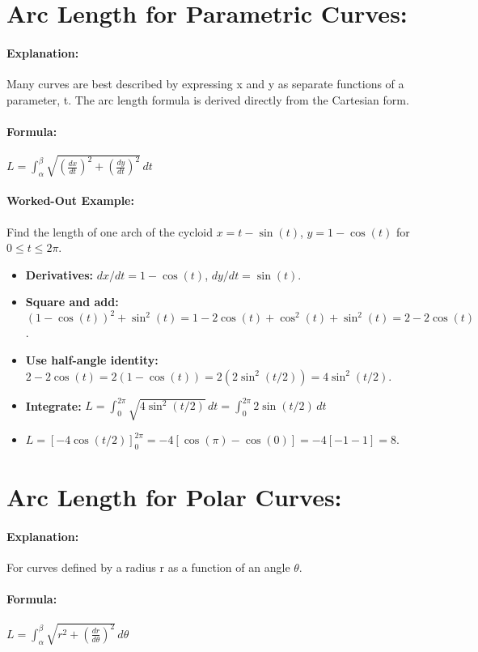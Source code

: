 \documentclass{article}
\begin{document}
\section*{Arc Length for Parametric Curves:}
\paragraph{Explanation:} Many curves are best described by expressing x and y as separate functions of a parameter, t. The arc length formula is derived directly from the Cartesian form.
\paragraph{Formula:} $L = \int_{\alpha}^{\beta} \sqrt{(\frac{dx}{dt})^2 + (\frac{dy}{dt})^2} \,dt$
\paragraph{Worked-Out Example:} Find the length of one arch of the cycloid $x = t - \sin(t)$, $y = 1 - \cos(t)$ for $0 \le t \le 2\pi$.
\begin{itemize}
    \item \textbf{Derivatives:} $dx/dt = 1 - \cos(t)$, $dy/dt = \sin(t)$.
    \item \textbf{Square and add:} $(1 - \cos(t))^2 + \sin^2(t) = 1 - 2\cos(t) + \cos^2(t) + \sin^2(t) = 2 - 2\cos(t)$.
    \item \textbf{Use half-angle identity:} $2 - 2\cos(t) = 2(1 - \cos(t)) = 2(2\sin^2(t/2)) = 4\sin^2(t/2)$.
    \item \textbf{Integrate:} $L = \int_{0}^{2\pi} \sqrt{4\sin^2(t/2)} \,dt = \int_{0}^{2\pi} 2\sin(t/2) \,dt$
    \item $L = [-4\cos(t/2)]_{0}^{2\pi} = -4[\cos(\pi) - \cos(0)] = -4[-1 - 1] = 8$.
\end{itemize}

\section*{Arc Length for Polar Curves:}
\paragraph{Explanation:} For curves defined by a radius r as a function of an angle $\theta$.
\paragraph{Formula:} $L = \int_{\alpha}^{\beta} \sqrt{r^2 + (\frac{dr}{d\theta})^2} \,d\theta$
\end{document}
